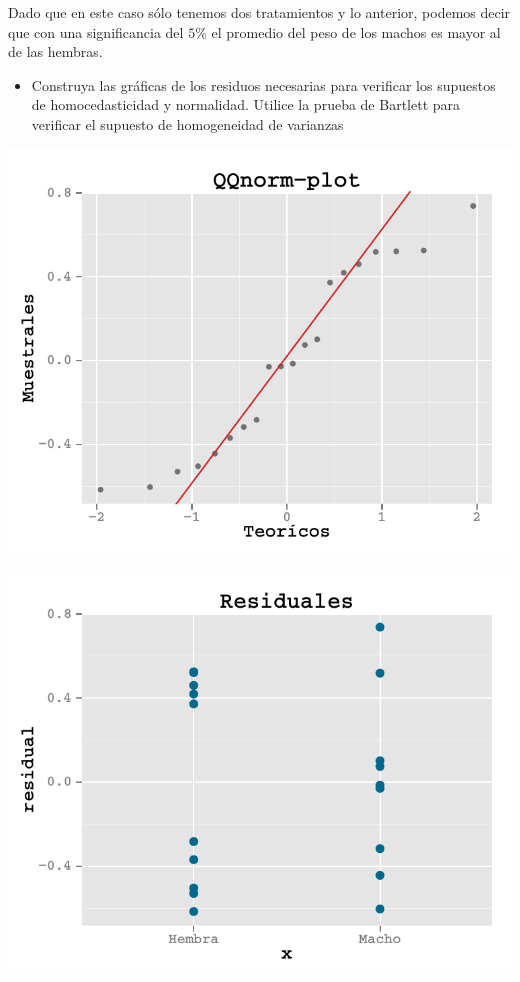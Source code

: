 \documentclass[a4paper]{scrartcl}\usepackage[]{graphicx}\usepackage[]{color}
\makeatletter
\def\maxwidth{ %
  \ifdim\Gin@nat@width>\linewidth
    \linewidth
  \else
    \Gin@nat@width
  \fi
}
\newenvironment{knitrout}{}{} %
\makeatother
\begin{document}
\begin{itemize}
\begin{itemize}
\noindent Dado que en este caso sólo tenemos dos tratamientos y lo anterior, podemos decir que con una significancia del $5\%$ el promedio del peso de los machos es mayor al de las hembras.\\

\begin{itemize}
  \item Construya las gráficas de los residuos necesarias para verificar los supuestos de homocedasticidad y normalidad. Utilice la prueba de Bartlett para verificar el supuesto de homogeneidad de varianzas 
\end{itemize}

\begin{knitrout}
\color{fgcolor}

{\centering \includegraphics[width=\maxwidth]{figure/unnamed-chunk-211} 

}




{\centering \includegraphics[width=\maxwidth]{figure/unnamed-chunk-212} 

}
\end{knitrout}
\end{itemize}
\end{itemize}
\end{document}
